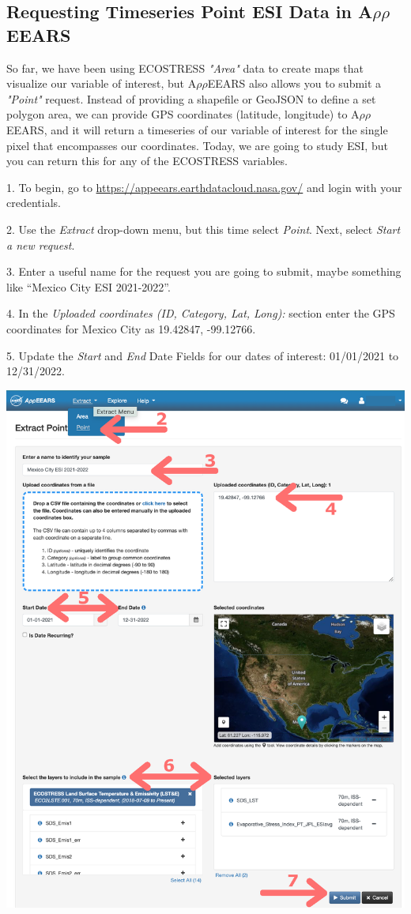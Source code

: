 \documentclass[oneside,a4paper,11pt,explicit]{book}
\begin{document}
\subsection{Requesting Timeseries Point ESI Data in A$\rho\rho$EEARS}

So far, we have been using ECOSTRESS \textit{"Area"} data to create maps that visualize our variable of interest, but A$\rho\rho$EEARS also allows you to submit a \textit{"Point"} request. Instead of providing a shapefile or GeoJSON to define a set polygon area, we can provide GPS coordinates (latitude, longitude) to A$\rho\rho$EEARS, and it will return a timeseries of our variable of interest for the single pixel that encompasses our coordinates. Today, we are going to study ESI, but you can return this for any of the ECOSTRESS variables. 

1. To begin, go to \href{https://appeears.earthdatacloud.nasa.gov/}{https://appeears.earthdatacloud.nasa.gov/} and login with your credentials. 

2. Use the \textit{Extract} drop-down menu, but this time select \textit{Point}. Next, select \textit{Start a new request}. 

3. Enter a useful name for the request you are going to submit, maybe something like ``Mexico City ESI 2021-2022''. 

4. In the \textit{Uploaded coordinates (ID, Category, Lat, Long):} section enter the GPS coordinates for Mexico City as 19.42847, -99.12766.

5. Update the \textit{Start} and \textit{End} Date Fields for our dates of interest: 01/01/2021 to 12/31/2022.

\centerline{\includegraphics[width=.6\textwidth]{ESIpointRequest.png}}
\end{document}

